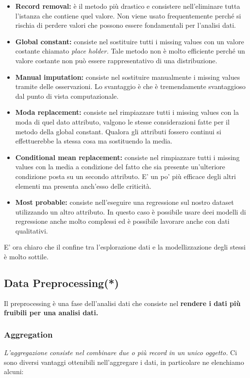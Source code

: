 \begin{itemize}
	\item \textbf{Record removal:} è il metodo più drastico e consistere nell'eliminare tutta l'istanza che contiene quel valore. Non viene usato frequentemente perché si rischia di perdere valori che possono essere fondamentali per l'analisi dati.
	
	\item \textbf{Global constant:} consiste nel sostituire tutti i missing values con un valore costante chiamato \textit{place holder.} Tale metodo non è molto efficiente perché un valore costante non può essere rappresentativo di una distribuzione.
	
	\item \textbf{Manual imputation:} consiste nel sostituire manualmente i missing values tramite delle osservazioni. Lo svantaggio è che è tremendamente svantaggioso dal punto di vista computazionale.
	\item  \textbf{Moda replacement:} consiste nel rimpiazzare tutti i missing values con la moda di quel dato attributo, valgono le stesse considerazioni fatte per il metodo della global constant. Qualora gli attributi fossero continui si effettuerebbe la stessa cosa ma sostituendo la media.
	\item \textbf{Conditional mean replacement:} consiste nel rimpiazzare tutti i missing values con la media a condizione del fatto che sia presente un'ulteriore condizione posta su un secondo attributo. E' un po' più efficace degli altri elementi ma presenta anch'esso delle criticità.
	
	\item \textbf{Most probable:} consiste nell'eseguire una regressione sul nostro dataset utilizzando un altro attributo. In questo caso è possibile usare deei modelli di regressione anche molto complessi ed è possibile lavorare anche con dati qualitativi.
\end{itemize}

E' ora chiaro che il confine tra l'esplorazione dati e la modellizzazione degli stessi è molto sottile.

\subsection{Data Preprocessing(*)}

Il preprocessing è una fase dell'analisi dati che consiste nel \textbf{rendere i dati più fruibili per una analisi dati.}

\subsubsection{Aggregation}
\textit{L'aggregazione consiste nel combinare due o più record in un unico oggetto.}
Ci sono diversi vantaggi ottenibili nell'aggregare i dati, in particolare ne elenchiamo alcuni:

